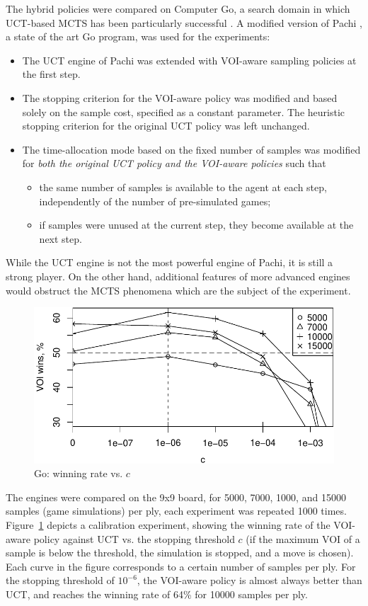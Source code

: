 \documentclass[]{article}
\begin{document}
The hybrid policies were compared on Computer Go, a search domain
in which UCT-based MCTS has been particularly successful
\citep{Gelly.mogo}. A modified version of Pachi \citep{Braudis.pachi}, a state of the art
Go program, was used for the experiments:
\begin{itemize}
\item The UCT engine of Pachi was extended with VOI-aware sampling
  policies at the first step. 
\item The stopping criterion for the VOI-aware policy was
  modified and based solely on the sample cost, specified as
  a constant parameter. The heuristic stopping criterion for the
  original UCT policy was left unchanged.
\item The time-allocation mode based on the fixed number of samples
  was modified for \textit{both the original UCT policy and the VOI-aware
  policies} such that 
  \begin{itemize}
    \item the same number of samples is available to
      the agent at each step, independently of the number of pre-simulated
      games;  
    \item if samples were unused at the current step,
      they become available at the next step. 
  \end{itemize}
\end{itemize}
While the UCT engine is not the most powerful engine of Pachi, it is still a strong
player. On the other hand, additional features of more advanced
engines would obstruct the MCTS phenomena which are the subject of
the experiment.
\begin{figure}[h!]
\centering
\includegraphics[scale=0.6]{uctvoi.pdf}
\caption{Go: winning rate vs. $c$}
\label{fig:uctvoi}
\end{figure}
The engines were compared on the 9x9 board, for 5000, 7000, 1000, and
15000 samples (game simulations) per ply, each experiment was repeated
1000 times. Figure~\ref{fig:uctvoi} depicts a calibration experiment,
showing the winning rate of the VOI-aware policy against UCT
vs. the stopping threshold $c$ (if the maximum VOI of a sample is below
the threshold, the simulation is stopped, and a move is chosen). Each
curve in the figure corresponds to a certain number of samples per
ply. For the stopping threshold of $10^{-6}$, the VOI-aware policy
is almost always better than UCT, and  reaches the winning rate of
64\% for 10000 samples per ply.
\end{document}
